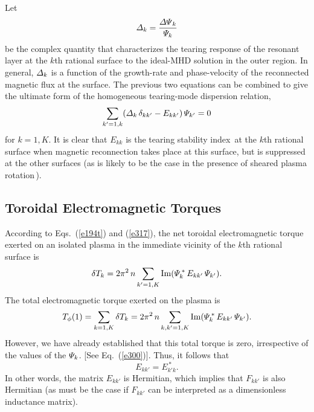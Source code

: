 \documentclass[12pt,prb,aps]{revtex4-1}
\begin{document}
Let
\begin{equation}\label{e403}
{\mit\Delta}_k = \frac{{\mit\Delta\Psi}_k}{{\mit\Psi}_k}
\end{equation}
 be the complex quantity that characterizes the
tearing response of the resonant layer at the $k$th rational surface to the ideal-MHD solution in the outer region.\cite{fkr}
In general, ${\mit\Delta}_k$ is a function of the growth-rate and phase-velocity of the reconnected magnetic flux at the surface.\cite{am1,layer,layer1}
The previous two equations can be combined to give the ultimate form of the homogeneous tearing-mode dispersion relation,
\begin{equation}
\sum_{k'=1,k}({\mit\Delta}_k\,\delta_{kk'}-E_{kk'})\,{\mit\Psi}_{k'} = 0
\end{equation}
for $k=1,K$. It is clear that $E_{kk}$ is the tearing stability index\,\cite{fkr} at the $k$th rational surface when magnetic reconnection  takes place
at this surface, but is suppressed at the other surfaces (as is likely to be the case in the presence of sheared plasma rotation\,\cite{am1}). 

\subsection{Toroidal Electromagnetic Torques}
According to Eqs.~(\ref{e194t}) and (\ref{e317}), the net toroidal electromagnetic torque exerted on an isolated plasma
in the immediate vicinity of the $k$th rational surface is
\begin{equation}\label{e405}
\delta T_k = 2\pi^2\,n\sum_{k'=1,K} {\rm Im}({\mit\Psi}_k^{\,\ast}\,E_{kk'}\,{\mit\Psi}_{k'}).
\end{equation}
The total electromagnetic torque exerted on the plasma is
\begin{equation}
T_\phi(1) = \sum_{k=1,K}\delta T_k =  2\pi^2\,n\sum_{k,k'=1,K} {\rm Im}({\mit\Psi}_k^{\,\ast}\,E_{kk'}\,{\mit\Psi}_{k'}).
\end{equation}
However, we have already established that this total torque is zero, irrespective of the values of the ${\mit\Psi}_k$. [See Eq.~(\ref{e300})].
Thus, it follows that
\begin{equation}
E_{kk'} = E_{k'k}^{\,\ast}.
\end{equation}
In other words, the matrix $E_{kk'}$ is Hermitian,\cite{am1} which implies that $F_{kk'}$ is also Hermitian (as must  be the case if $F_{kk'}$ can
be interpreted as 
a dimensionless inductance matrix). 
\end{document}
